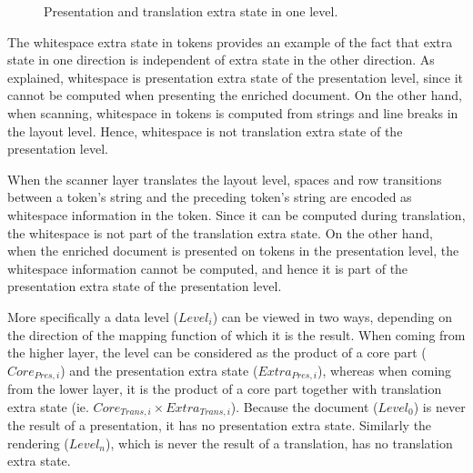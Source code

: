 \begin{figure}
\begin{center}
\begin{center}
\end{center}
\caption{Presentation and translation extra state in one level.}\label{levelExtraState} 
\end{center}
\end{figure}

The whitespace extra state in tokens provides an example of the fact that extra state in one direction is independent of extra state in the other direction. As explained, whitespace is presentation extra state of the presentation level, since it cannot be computed when presenting the enriched document. On the other hand, when scanning, whitespace in tokens is computed from strings and line breaks in the layout level. Hence, whitespace is not translation extra state of the presentation level.

\bc
When the scanner layer translates the layout level, spaces and row transitions between a token's string and the preceding token's string are encoded as whitespace information in the token. Since it can be computed during translation, the whitespace is not part of the translation extra state. On the other hand, when the enriched document is presented on tokens in the presentation level, the whitespace information cannot be computed, and hence it is part of the presentation extra state of the presentation level.
\ec


More specifically a data level ($Level_{i}$) can be viewed in two ways, depending on the direction of the mapping function of which it is the result. When coming from the higher layer, the level can be considered as the product of a core part ($Core_{Pres,i}$) and the presentation extra state ($Extra_{Pres,i}$), whereas when coming from the lower layer, it is the product of a core part together with translation extra state (ie. $Core_{Trans,i} \times Extra_{Trans,i}$). Because the document ($Level_0$) is never the result of a presentation, it has no presentation extra state. Similarly the rendering ($Level_n$), which is never the result of a translation, has no translation extra state.

